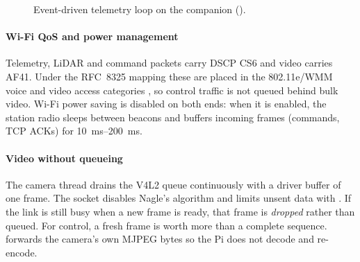 \begin{figure}[H]
\centering
{}
\caption{Event-driven telemetry loop on the companion ().}
\label{fig:flow-telemetry}
\end{figure}

\paragraph{Wi-Fi QoS and power management} Telemetry, LiDAR and command packets carry
DSCP CS6 and video carries AF41. Under the RFC~8325 mapping \cite{rfc8325} these
are placed in the 802.11e/WMM voice and video access categories \cite{ieee80211e}, so
control traffic is not queued behind bulk video. Wi-Fi power saving is disabled on both
ends: when it is enabled, the station radio sleeps between beacons and buffers
incoming frames (commands, TCP ACKs) for \SIrange{10}{200}{\milli\second}.

\paragraph{Video without queueing} The camera thread drains the V4L2 queue
continuously with a driver buffer of one frame. The socket disables Nagle's algorithm
\cite{rfc896} and limits unsent data with . If the link is
still busy when a new frame is ready, that frame is \emph{dropped} rather than queued.
For control, a fresh frame is worth more than a complete sequence.
 forwards the camera's own MJPEG bytes so the Pi does not
decode and re-encode.

